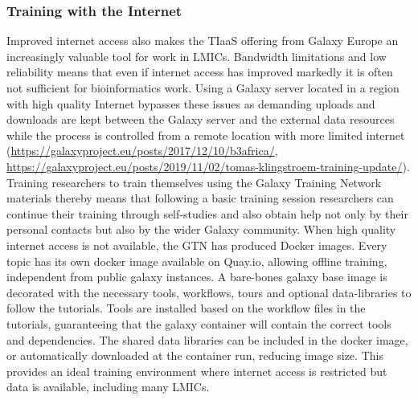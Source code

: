 \documentclass[10pt,letterpaper]{article}
\begin{document}
\subsubsection*{Training with the Internet}
Improved internet access also makes the TIaaS offering from Galaxy Europe an increasingly valuable tool for work in LMICs.
Bandwidth limitations and low reliability means that even if internet access has improved markedly it is often not sufficient for bioinformatics work.
Using a Galaxy server located in a region with high quality Internet bypasses these issues as demanding uploads and downloads are kept between the Galaxy server and the external data resources while the process is controlled from a remote location with more limited internet (\url{https://galaxyproject.eu/posts/2017/12/10/b3africa/}, \url{https://galaxyproject.eu/posts/2019/11/02/tomas-klingstroem-training-update/}).
Training researchers to train themselves using the Galaxy Training Network materials thereby means that following a basic training session researchers can continue their training through self-studies and also obtain help not only by their personal contacts but also by the wider Galaxy community.
When high quality internet access is not available, the GTN has produced Docker images.
Every topic has its own docker image available on Quay.io, allowing offline training, independent from public galaxy instances. A bare-bones galaxy base image is decorated with the necessary tools, workflows, tours and optional data-libraries to follow the tutorials.
Tools are installed based on the workflow files in the tutorials, guaranteeing that the galaxy container will contain the correct tools and dependencies.
The shared data libraries can be included in the docker image, or automatically downloaded at the container run, reducing image size.
This provides an ideal training environment where internet access is restricted but data is available, including many LMICs.
\end{document}
